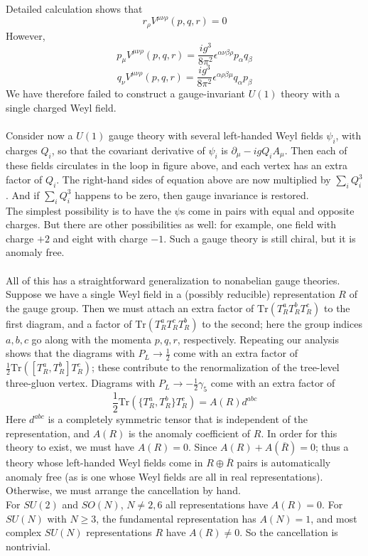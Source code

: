 \documentclass[cyan]{elegantnote}
\begin{document}
\noindent
Detailed calculation shows that
\[r_{\rho}V^{\mu\nu\rho}(p,q,r) = 0\]
However,
\[p_{\mu}V^{\mu\nu\rho}(p,q,r) = \frac{ig^3}{8\pi^2}\epsilon^{\alpha\nu\beta\rho}p_{\alpha}q_{\beta}\]
\[q_{\nu}V^{\mu\nu\rho}(p,q,r) = \frac{ig^3}{8\pi^2}\epsilon^{\alpha\rho\beta\mu}q_{\alpha}p_{\beta}\]
We have therefore failed to construct a gauge-invariant $U(1)$ theory with a single charged Weyl field.
\\ \\
Consider now a $U(1)$ gauge theory with several left-handed Weyl fields $\psi_i$, with charges $Q_i$, so that the covariant derivative of $\psi_i$ is $\partial_{\mu} - igQ_iA_{\mu}$. Then each of these fields circulates in the loop in figure above, and each vertex has an extra factor of $Q_i$. The right-hand sides of equation above are now multiplied by $\sum_i Q_i^3$. And if $\sum_i Q_i^3$ happens to be zero, then gauge invariance is restored. 
\\
The simplest possibility is to have the $\psi$s come in
pairs with equal and opposite charges. But there are other possibilities as well: for example, one field with charge $+2$ and eight with charge $-1$. Such a gauge theory is still chiral, but it is anomaly free.
\\ \\
All of this has a straightforward generalization to nonabelian gauge theories. 
Suppose we have a single Weyl field in a (possibly reducible) representation $R$ of the gauge group. Then we must attach an extra factor of $\mathrm{Tr}(T^a_R T^b_R T^c_R)$ to the first diagram, and a factor of $\mathrm{Tr}(T^a_R T^c_R T^b_R)$ to the second; here the group indices $a,b,c$ go along with the momenta $p,q,r$, respectively.
Repeating our analysis shows that the diagrams with $P_L \to \frac{1}{2}$ come with an extra factor of $\frac{1}{2}\mathrm{Tr}([T^a_R, T^b_R] T^c_R)$; these contribute to the renormalization of the tree-level three-gluon vertex. Diagrams with $P_L \to - \frac{1}{2}\gamma_5$ come with an extra factor of
\[\frac{1}{2}\mathrm{Tr}(\{T^a_R, T^b_R\} T^c_R) = A(R)d^{abc}\]
Here $d^{abc}$ is a completely symmetric tensor that is independent of the representation, and $A(R)$ is the anomaly coefficient of $R$. In order for this theory to exist, we must have $A(R) = 0$. 
Since $A(R) + A(\overline{R}) = 0$; thus a theory whose left-handed Weyl fields come in $R \oplus \overline{R}$ pairs is automatically anomaly free (as is one whose Weyl fields are all in real representations). Otherwise, we must arrange the cancellation by hand. 
\\
For $SU(2)$ and $SO(N)$, $N \neq 2,6$ all representations have $A(R) = 0$. For $SU(N)$ with $N \geq 3$, the fundamental representation has $A(N) = 1$, and most complex $SU(N)$ representations $R$ have $A(R) \neq 0$. So the cancellation is nontrivial.
\end{document}
